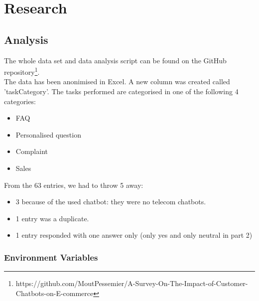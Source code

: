 \mainmatter
\pagestyle{headings}
\chapter{Research}
\label{ch:research}

\section{Analysis}
The whole data set and data analysis script can be found on the GitHub repository\footnote{https://github.com/MoutPessemier/A-Survey-On-The-Impact-of-Customer-Chatbots-on-E-commerce}.\\
\break
The data has been anonimised in Excel. A new column was created called 'taskCategory'. The tasks performed are categorised in one of the following 4 categories:
\begin{itemize}
	\item FAQ
	\item Personalised question
	\item Complaint
	\item Sales
\end{itemize}
From the 63 entries, we had to throw 5 away:
\begin{itemize}
	\item 3 because of the used chatbot: they were no telecom chatbots.
	\item 1 entry was a duplicate.
	\item 1 entry responded with one answer only (only yes and only neutral in part 2)
\end{itemize}

\subsection{Environment Variables}
